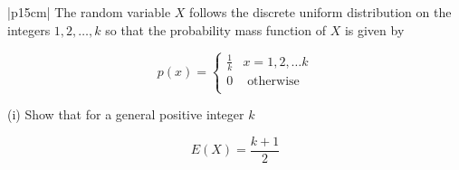 \documentclass[a4paper,12pt]{article}
\begin{document}
\begin{table}[ht!]
     \centering
     \begin{tabular}{|p{15cm}|}
     \hline        
The random variable $X$ follows the discrete uniform distribution on the integers $1, 2, \ldots, k$ so that the probability mass function of $X$ is given by 

\[ p(x)   = \begin{cases}  \frac{1}{k}   & x = 1,2,\ldots k \\
0 & \mbox{ otherwise } \\ \end{cases}\]

 
(i) Show that for a general positive integer $k$ 

 \[E(X)  = \frac{k+1}{2}\] 

 
 \\ \hline
      \end{tabular}
    \end{table}
\end{document}
